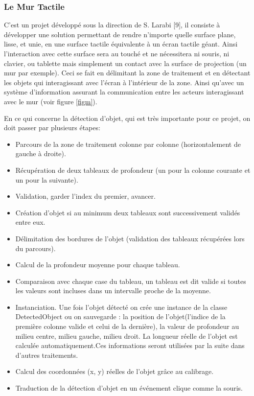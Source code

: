 \documentclass[12pt,a4paper,oneside]{book}
\begin{document}
	
	\subsubsection{Le Mur Tactile}
	C'est un projet développé sous la direction de S. Larabi [9], il consiste à développer une solution permettant de rendre n’importe quelle surface plane, lisse, et unie, en une surface tactile équivalente à un écran tactile géant. Ainsi l’interaction avec cette surface sera au touché et ne nécessitera ni souris, ni clavier, ou tablette mais simplement un contact avec la surface de projection (un mur par exemple). Ceci se fait en délimitant la zone de traitement et en détectant les objets qui interagissant avec l'écran à l’intérieur de la zone. Ainsi qu'avec un système d’information assurant la communication entre les acteurs interagissant avec le mur \cite{9} (voir figure \ref{figm}).
	
	En ce qui concerne la détection d'objet, qui est très importante pour ce projet, on doit passer par plusieurs étapes:
	\begin{itemize}
		\item Parcours de la zone de traitement colonne par colonne (horizontalement de gauche à droite).
		\item Récupération de deux tableaux de profondeur (un pour la colonne courante et un pour la suivante).
		\item Validation, garder l'index du premier, avancer.
		\item Création d'objet si au minimum deux tableaux sont successivement validés entre eux.
		\item Délimitation des bordures de l'objet (validation des tableaux récupérées lors du parcours).
		\item Calcul de la profondeur moyenne pour chaque tableau.
		\item Comparaison avec chaque case du tableau, un tableau est dit valide si toutes les valeurs sont incluses dans un intervalle proche de la moyenne.
		\item Instanciation. Une fois l'objet détecté on crée une instance de la classe DetectedObject ou on sauvegarde : la position de l'objet(l'indice de la première colonne valide et celui de la dernière), la valeur de profondeur au milieu centre, milieu gauche, milieu droit. La longueur réelle de l’objet est calculée automatiquement.Ces informations seront utilisées par la suite dans d'autres traitements.
		\item Calcul des coordonnées (x, y) réelles de l'objet grâce au calibrage.
		\item Traduction de la détection d'objet en un événement clique comme la souris.
	\end{itemize}
	
\end{document}
